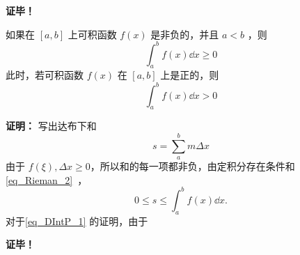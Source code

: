 \textbf{证毕！} 

\begin{theorem}{}
如果在 $[a,b]$ 上可积函数 $f(x)$ 是非负的，并且 $a<b$ ，则
\begin{equation}
\int_a^b f(x)\dd x\geq0
\end{equation}
此时，若可积函数 $f(x)$ 在 $[a,b]$ 上是正的，则
\begin{equation}\label{eq_DIntP_1}
\int_a^b f(x)\dd x>0
\end{equation}
\end{theorem}
\textbf{证明：}
写出达布下和
\begin{equation}
s=\sum_{a}^bm\Delta x
\end{equation}
由于 $f(\xi),\Delta x\geq0$，所以和的每一项都非负，由定积分存在条件和\autoref{eq_Rieman_2}~，
\begin{equation}
0\leq s\leq\int_a^b f(x)\dd x.
\end{equation}
对于\autoref{eq_DIntP_1} 的证明，由于

\textbf{证毕！}